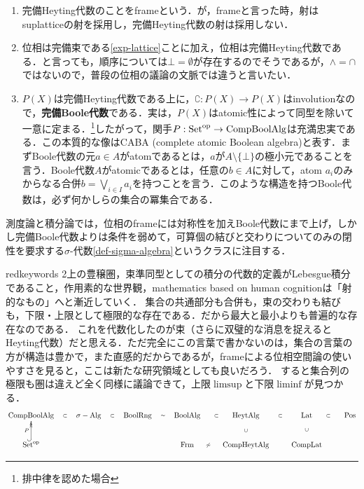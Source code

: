 \documentclass[uplatex, dvipdfmx]{jsreport}
\begin{document}
\begin{example}[完備Heyting代数とBoole代数の例]\mbox{}
    \begin{enumerate}
        \item 完備Heyting代数のことをframeという．が，frameと言った時，射はsuplatticeの射を採用し，完備Heyting代数の射は採用しない．
        \item 位相は完備束である\ref{exp-lattice}ことに加え，位相は完備Heyting代数である．と言っても，順序については$\bot=\emptyset$が存在するのでそうであるが，$\land=\cap$ではないので，普段の位相の議論の文脈では違うと言いたい．
        \item $P(X)$は完備Heyting代数である上に，$\complement:P(X)\to P(X)$はinvolutionなので，\textbf{完備Boole代数}である．実は，$P(X)$はatomic性によって同型を除いて一意に定まる．\footnote{排中律を認めた場合}したがって，関手$P:\mathrm{Set}^{\mathrm{op}}\to\mathrm{CompBoolAlg}$は充満忠実である．この本質的な像はCABA (complete atomic Boolean algebra)と表す．まずBoole代数の元$a\in A$がatomであるとは，$a$が$A\setminus\{\bot\}$の極小元であることを言う．Boole代数$A$がatomicであるとは，任意の$b\in A$に対して，atom $a_i$のみからなる合併$b=\bigvee_{i\in I}a_i$を持つことを言う．このような構造を持つBoole代数は，必ず何かしらの集合の冪集合である．
    \end{enumerate}
    測度論と積分論では，位相のframeには対称性を加えBoole代数にまで上げ，しかし完備Boole代数よりは条件を弱めて，可算個の結びと交わりについてのみの閉性を要求する$\sigma$-代数\ref{def-sigma-algebra}というクラスに注目する．
\end{example}

\begin{tbox}{red}{keywords}
    2上の豊穣圏，束準同型としての積分の代数的定義がLebesgue積分であること，作用素的な世界観，mathematics based on human cognitionは「射的なもの」へと漸近していく．
    集合の共通部分も合併も，束の交わりも結びも，下限・上限として極限的な存在である．だから最大と最小よりも普遍的な存在なのである．
    これを代数化したのが束（さらに双璧的な消息を捉えるとHeyting代数）だと思える．ただ完全にこの言葉で書かないのは，集合の言葉の方が構造は豊かで，また直感的だからであるが，frameによる位相空間論の使いやすさを見ると，ここは新たな研究領域としても良いだろう．
    すると集合列の極限も圏は違えど全く同様に議論できて，上限$\limsup$と下限$\liminf$が見つかる．
    \[\xymatrix{
        \CompBoolAlg\ar@{}[r]|-\subset&\sigma-\Alg\ar@{}[r]|-\subset&\BoolRng\ar@{}[r]|-\sim&\BoolAlg\ar@{}[r]|-\subset&\HeytAlg\ar@{}[r]|-\subset\ar@{}[d]|-\cup&\Lat\ar@{}[r]|-\subset\ar@{}[d]|-\cup&\Pos\\
        \Set^\op\ar@{^{(}->>}[u]^-P&&&\Frm\ar@{}[r]|-{\not\sim}&\CompHeytAlg&\CompLat
    }\]
\end{tbox}
\end{document}
